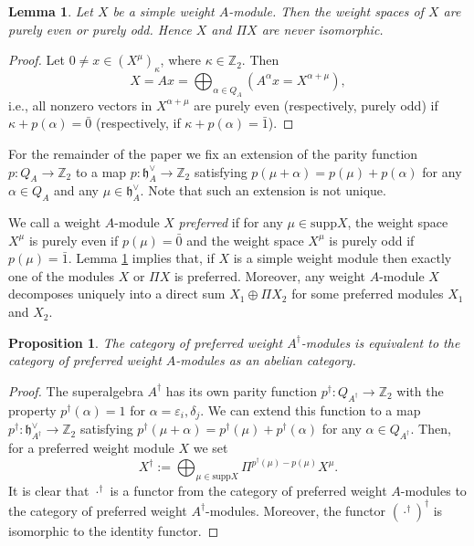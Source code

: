 \documentclass[12pt]{amsart}
\makeatletter
\def\@putname#1#2#3#4{\def\@@ref{#3}\let\old@bf\bf
        \def\bf##1{\old@bf\if?\noexpand##1?{#4}\else##1\fi}%
	#1{#2}%
        \let\bf\old@bf}
\def\@putname#1#2#3#4{\def\@@ref{#3}\let\old@bf\bf	%
	\let\old@reset@font\reset@font			%
        \def\bf##1{\old@bf\if?\noexpand##1?{#4}\else##1\fi}%
	\def\reset@font##1##2{\old@reset@font##1\if?\noexpand##2?{#4}\else##2\fi}#1{#2}%
        \let\bf\old@bf\let\reset@font\old@reset@font}
\let\my@ref=\ref
\def\ref#1{\@putname\my@ref{#1}{#1}{\tiny\rm\@@ref}}
\theoremstyle{plain} %
\numberwithin{equation}{section}
\theoremstyle{definition}
\theoremstyle{remark}
\theoremstyle{plain} %
\newtheorem{lemma}[definition]{Lemma}
\newtheorem{proposition}[definition]{Proposition}
\newcommand{\hh}{\mathfrak{h}}
\newcommand{\ZZ}{\mathbb{Z}}
\newcommand{\supp}{\mathrm{supp}}
\newcommand{\Z}{\mathbb{Z}}
\makeatother
\begin{document}
         
\begin{lemma}\label{pure}
Let $X$ be a simple weight $A$-module. Then the weight spaces of $X$ are purely even or purely odd. Hence $X$ and $\Pi X$ are never isomorphic.
\end{lemma}
\begin{proof}   Let $0 \neq x\in (X^\mu)_{{\kappa}}$, where ${\kappa} \in \mathbb Z_2 $. Then
  $$X=Ax=\bigoplus_{\alpha\in Q_A} (A^\alpha x = X^{\alpha + \mu}),$$
  i.e., all nonzero vectors in $X^{\alpha + \mu}$ are purely even (respectively, purely odd) if ${\kappa} + p(\alpha) = \bar{0}$ (respectively, if ${\kappa} + p(\alpha) = \bar{1}$).
    \end{proof}

        
  For the remainder of the paper we fix an extension  of the parity function $p:Q_A\to\Z_2$ to a  map $p:\hh_A^{\vee}\to \ZZ_2$ satisfying $p(\mu+\alpha)=p(\mu)+p(\alpha)$ for any $\alpha\in Q_A$
          and any $\mu\in\hh_A^{\vee}$. Note that such an extension is not unique.
          
 We call a weight $A$-module $X$ \emph{preferred} if for any $\mu \in \supp X$, the weight space $X^\mu$ is purely even if $p(\mu)=\bar 0$ and the weight space $X^\mu$ is purely odd if $p(\mu)=\bar 1$.  Lemma \ref{pure} implies that, if $X$ is a simple weight module then exactly one of the modules $X$ or $\Pi X$ is preferred. 
Moreover, any weight $A$-module
      $X$ decomposes uniquely into a direct sum $X_1\oplus\Pi X_2$ for some preferred modules $X_1$ and $X_2$. 

             
        
        \begin{proposition}\label{dagger} The category of preferred weight $A^\dagger$-modules is equivalent to the category of preferred weight $A$-modules as an abelian category.
        \end{proposition}
        \begin{proof}  The superalgebra $A^\dagger$ has its own parity function $p^\dagger:Q_{A^\dagger}\to\Z_2$ with the property
          $p^{\dagger} (\alpha) = 1$ for $\alpha = \varepsilon_i,\delta_j$. We can extend this function 
          to  a  map $p^\dagger:\hh_{A^\dagger}^{\vee}\to \ZZ_2$ satisfying $p^\dagger(\mu+\alpha)=p^\dagger(\mu)+p^\dagger(\alpha)$ for any
          $\alpha\in Q_{A^\dagger}$. Then, for a preferred weight module $X$ we set
          $$X^\dagger:=\bigoplus_{\mu\in\supp X} \Pi^{p^\dagger(\mu)-p(\mu)}X^\mu.$$
          It is clear that ${\cdot}^\dagger$ is a functor from the category of preferred weight $A$-modules to the category of preferred weight $A^\dagger$-modules. Moreover, the functor $({\cdot}^{\dagger})^\dagger$ is isomorphic to the identity functor.
        \end{proof}
\end{document}
